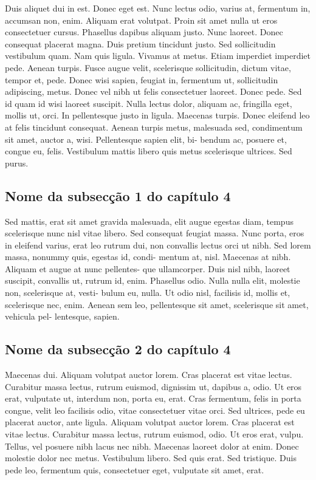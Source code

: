 Duis aliquet dui in est. Donec eget est. Nunc lectus odio, varius at, fermentum in, accumsan non, enim. Aliquam erat volutpat. Proin sit amet nulla ut eros consectetuer cursus. Phasellus dapibus aliquam justo. Nunc laoreet. Donec consequat placerat magna. Duis pretium tincidunt justo. Sed sollicitudin vestibulum quam. Nam quis ligula. Vivamus at metus. Etiam imperdiet imperdiet pede. Aenean turpis. Fusce augue velit, scelerisque sollicitudin, dictum vitae, tempor et, pede. Donec wisi sapien, feugiat in, fermentum ut, sollicitudin adipiscing, metus. Donec vel nibh ut felis consectetuer laoreet. Donec pede. Sed id quam id wisi laoreet suscipit. Nulla lectus dolor, aliquam ac, fringilla eget, mollis ut, orci. In pellentesque justo in ligula. Maecenas turpis. Donec eleifend leo at felis tincidunt consequat. Aenean turpis metus, malesuada sed, condimentum sit amet, auctor a, wisi. Pellentesque sapien elit, bi- bendum ac, posuere et, congue eu, felis. Vestibulum mattis libero quis metus scelerisque ultrices. Sed purus.

\subsection{Nome da subsecção 1 do capítulo 4}
Sed mattis, erat sit amet gravida malesuada, elit augue egestas diam, tempus scelerisque nunc nisl vitae libero. Sed consequat feugiat massa. Nunc porta, eros in eleifend varius, erat leo rutrum dui, non convallis lectus orci ut nibh. Sed lorem massa, nonummy quis, egestas id, condi- mentum at, nisl. Maecenas at nibh. Aliquam et augue at nunc pellentes- que ullamcorper. Duis nisl nibh, laoreet suscipit, convallis ut, rutrum id, enim. Phasellus odio. Nulla nulla elit, molestie non, scelerisque at, vesti- bulum eu, nulla. Ut odio nisl, facilisis id, mollis et, scelerisque nec, enim. Aenean sem leo, pellentesque sit amet, scelerisque sit amet, vehicula pel- lentesque, sapien.

\subsection{Nome da subsecção 2 do capítulo 4}
Maecenas dui. Aliquam volutpat auctor lorem. Cras placerat est vitae lectus. Curabitur massa lectus, rutrum euismod, dignissim ut, dapibus a, odio. Ut eros erat, vulputate ut, interdum non, porta eu, erat. Cras fermentum, felis in porta congue, velit leo facilisis odio, vitae consectetuer vitae orci. Sed ultrices, pede eu placerat auctor, ante ligula. Aliquam volutpat auctor lorem. Cras placerat est vitae lectus. Curabitur massa lectus, rutrum euismod, odio. Ut eros erat, vulpu. Tellus, vel posuere nibh lacus nec nibh. Maecenas laoreet dolor at enim. Donec molestie dolor nec metus. Vestibulum libero. Sed quis erat. Sed tristique. Duis pede leo, fermentum quis, consectetuer eget, vulputate sit amet, erat.